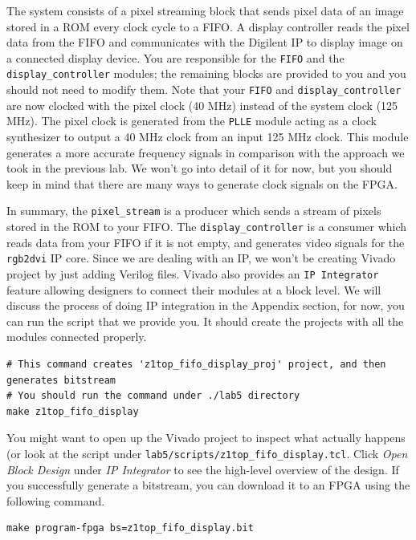 \documentclass[11pt]{article}
\begin{document}
The system consists of a pixel streaming block that sends pixel data of an image stored in a ROM every clock cycle to a FIFO. A display controller reads the pixel data from the FIFO and communicates with the Digilent IP to display image on a connected display device. You are responsible for the \verb|FIFO| and the \verb|display_controller| modules; the remaining blocks are provided to you and you should not need to modify them. Note that your \verb|FIFO| and \verb|display_controller| are now clocked with the pixel clock (40 MHz) instead of the system clock (125 MHz). The pixel clock is generated from the \verb|PLLE| module acting as a clock synthesizer to output a 40 MHz clock from an input 125 MHz clock. This module generates a more accurate frequency signals in comparison with the approach we took in the previous lab. We won't go into detail of it for now, but you should keep in mind that there are many ways to generate clock signals on the FPGA.

In summary, the \verb|pixel_stream| is a producer which sends a stream of pixels stored in the ROM to your FIFO. The \verb|display_controller| is a consumer which reads data from your FIFO if it is not empty, and generates video signals for the \verb|rgb2dvi| IP core. Since we are dealing with an IP, we won't be creating Vivado project by just adding Verilog files. Vivado also provides an \texttt{IP Integrator} feature allowing designers to connect their modules at a block level. We will discuss the process of doing IP integration in the Appendix section, for now, you can run the script that we provide you. It should create the projects with all the modules connected properly.

\begin{verbatim}
# This command creates 'z1top_fifo_display_proj' project, and then generates bitstream
# You should run the command under ./lab5 directory
make z1top_fifo_display
\end{verbatim}

You might want to open up the Vivado project to inspect what actually happens (or look at the script under \verb|lab5/scripts/z1top_fifo_display.tcl|. Click \emph{Open Block Design} under \emph{IP Integrator} to see the high-level overview of the design. If you successfully generate a bitstream, you can download it to an FPGA using the following command.

\begin{verbatim}
make program-fpga bs=z1top_fifo_display.bit
\end{verbatim}
\end{document}
